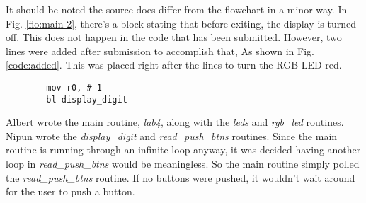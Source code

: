 \documentclass[letterpaper,10pt]{article}
\begin{document}
    \begin{minipage}{\linewidth}
        
        \label{flo:main 1}
    \end{minipage}

    
    \label{flo:main 2}

    It should be noted the source does differ from the flowchart in a minor way.
    In Fig. \ref{flo:main 2}, there's a block stating that before exiting, the
    display is turned off. This does not happen in the code that has been
    submitted. However, two lines were added after submission to accomplish that,
    As shown in Fig. \ref{code:added}. This was placed right after the lines to
    turn the RGB LED red.

    \begin{minipage}{\linewidth}
        \begin{lstlisting}
        mov r0, #-1
        bl display_digit
        \end{lstlisting}
        \label{code:added}
    \end{minipage}

    Albert wrote the main routine, \textit{lab4}, along with the \textit{leds}
    and \textit{rgb\_led} routines. Nipun wrote the \textit{display\_digit} and
    \textit{read\_push\_btns} routines. Since the main routine is running
    through an infinite loop anyway, it was decided having another loop in
    \textit{read\_push\_btns} would be meaningless. So the main routine simply
    polled the \textit{read\_push\_btns} routine. If no buttons were pushed, it
    wouldn't wait around for the user to push a button.
\end{document}
